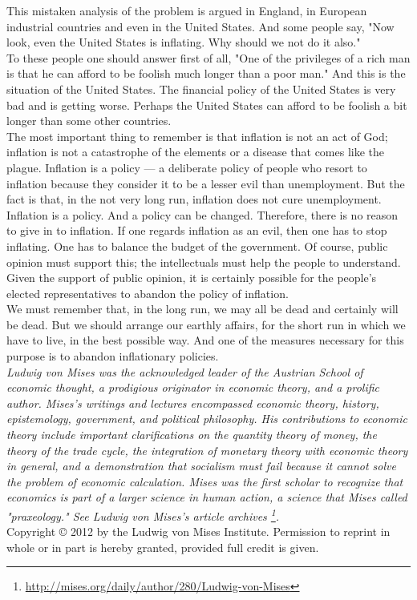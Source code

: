\documentclass[a4paper]{article}
\begin{document}
This mistaken analysis of the problem is argued in England, in European 
industrial countries and even in the United States. And some people say, "Now 
look, even the United States is inflating. Why should we not do it also."\\

To these people one should answer first of all, "One of the privileges of a 
rich man is that he can afford to be foolish much longer than a poor man." And 
this is the situation of the United States. The financial policy of the United 
States is very bad and is getting worse. Perhaps the United States can afford 
to be foolish a bit longer than some other countries.\\

The most important thing to remember is that inflation is not an act of God; 
inflation is not a catastrophe of the elements or a disease that comes like the
plague. Inflation is a policy — a deliberate policy of people who resort to 
inflation because they consider it to be a lesser evil than unemployment. But 
the fact is that, in the not very long run, inflation does not cure 
unemployment.\\

Inflation is a policy. And a policy can be changed. Therefore, there is no 
reason to give in to inflation. If one regards inflation as an evil, then one 
has to stop inflating. One has to balance the budget of the government. Of 
course, public opinion must support this; the intellectuals must help the 
people to understand. Given the support of public opinion, it is certainly 
possible for the people's elected representatives to abandon the policy of 
inflation.\\

We must remember that, in the long run, we may all be dead and certainly will 
be dead. But we should arrange our earthly affairs, for the short run in which 
we have to live, in the best possible way. And one of the measures necessary 
for this purpose is to abandon inflationary policies.\\


\emph{Ludwig von Mises was the acknowledged leader of the Austrian School of economic
thought, a prodigious originator in economic theory, and a prolific author. 
Mises's writings and lectures encompassed economic theory, history, 
epistemology, government, and political philosophy. His contributions to 
economic theory include important clarifications on the quantity theory of 
money, the theory of the trade cycle, the integration of monetary theory with 
economic theory in general, and a demonstration that socialism must fail 
because it cannot solve the problem of economic calculation. Mises was the 
first scholar to recognize that economics is part of a larger science in human 
action, a science that Mises called "praxeology." See Ludwig von Mises's 
article archives \footnote{\url{http://mises.org/daily/author/280/Ludwig-von-Mises}}.}\\

Copyright © 2012 by the Ludwig von Mises Institute. Permission to reprint in 
whole or in part is hereby granted, provided full credit is given.
\end{document}
